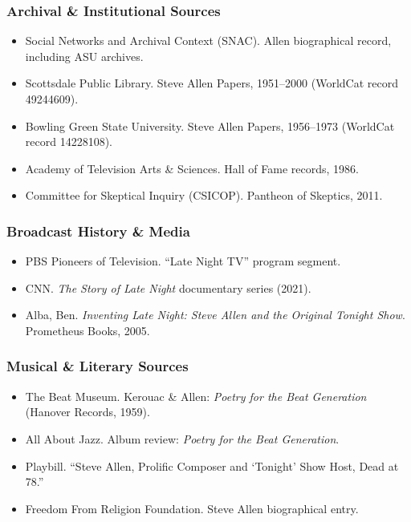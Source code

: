 \documentclass[11pt,letterpaper]{article}
\begin{document}
\subsubsection{Archival \& Institutional Sources}
\begin{itemize}[leftmargin=2em]
\item Social Networks and Archival Context (SNAC). Allen biographical record, including ASU archives.
\item Scottsdale Public Library. Steve Allen Papers, 1951--2000 (WorldCat record 49244609).
\item Bowling Green State University. Steve Allen Papers, 1956--1973 (WorldCat record 14228108).
\item Academy of Television Arts \& Sciences. Hall of Fame records, 1986.
\item Committee for Skeptical Inquiry (CSICOP). Pantheon of Skeptics, 2011.
\end{itemize}

\subsubsection{Broadcast History \& Media}
\begin{itemize}[leftmargin=2em]
\item PBS Pioneers of Television. ``Late Night TV'' program segment.
\item CNN. \textit{The Story of Late Night} documentary series (2021).
\item Alba, Ben. \textit{Inventing Late Night: Steve Allen and the Original Tonight Show}. Prometheus Books, 2005.
\end{itemize}

\subsubsection{Musical \& Literary Sources}
\begin{itemize}[leftmargin=2em]
\item The Beat Museum. Kerouac \& Allen: \textit{Poetry for the Beat Generation} (Hanover Records, 1959).
\item All About Jazz. Album review: \textit{Poetry for the Beat Generation}.
\item Playbill. ``Steve Allen, Prolific Composer and `Tonight' Show Host, Dead at 78.''
\item Freedom From Religion Foundation. Steve Allen biographical entry.
\end{itemize}
\end{document}
